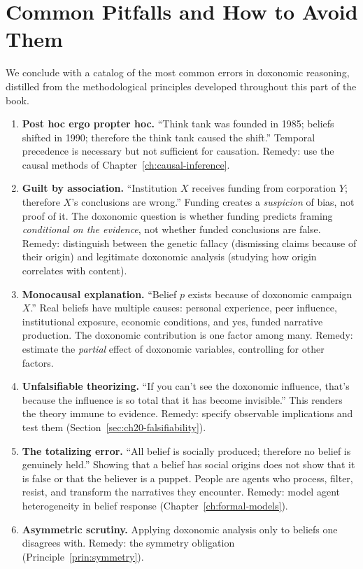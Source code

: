 \section{Common Pitfalls and How to Avoid Them}
\label{sec:ch20-pitfalls}

We conclude with a catalog of the most common errors in doxonomic reasoning, distilled from the methodological principles developed throughout this part of the book.

\begin{enumerate}
  \item \textbf{Post hoc ergo propter hoc.}
  ``Think tank was founded in 1985; beliefs shifted in 1990; therefore the think tank caused the shift.''
  Temporal precedence is necessary but not sufficient for causation.
  Remedy: use the causal methods of Chapter~\ref{ch:causal-inference}.

  \item \textbf{Guilt by association.}
  ``Institution $X$ receives funding from corporation $Y$; therefore $X$'s conclusions are wrong.''
  Funding creates a \emph{suspicion} of bias, not proof of it.
  The doxonomic question is whether funding predicts framing \emph{conditional on the evidence}, not whether funded conclusions are false.
  Remedy: distinguish between the genetic fallacy (dismissing claims because of their origin) and legitimate doxonomic analysis (studying how origin correlates with content).

  \item \textbf{Monocausal explanation.}
  ``Belief $p$ exists because of doxonomic campaign $X$.''
  Real beliefs have multiple causes: personal experience, peer influence, institutional exposure, economic conditions, and yes, funded narrative production.
  The doxonomic contribution is one factor among many.
  Remedy: estimate the \emph{partial} effect of doxonomic variables, controlling for other factors.

  \item \textbf{Unfalsifiable theorizing.}
  ``If you can't see the doxonomic influence, that's because the influence is so total that it has become invisible.''
  This renders the theory immune to evidence.
  Remedy: specify observable implications and test them (Section~\ref{sec:ch20-falsifiability}).

  \item \textbf{The totalizing error.}
  ``All belief is socially produced; therefore no belief is genuinely held.''
  Showing that a belief has social origins does not show that it is false or that the believer is a puppet.
  People are agents who process, filter, resist, and transform the narratives they encounter.
  Remedy: model agent heterogeneity in belief response (Chapter~\ref{ch:formal-models}).

  \item \textbf{Asymmetric scrutiny.}
  Applying doxonomic analysis only to beliefs one disagrees with.
  Remedy: the symmetry obligation (Principle~\ref{prin:symmetry}).
\end{enumerate}

